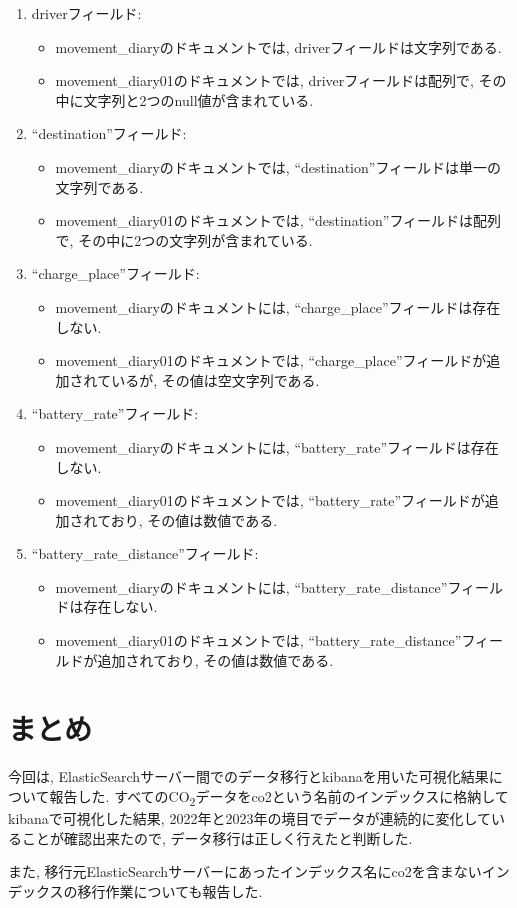 \documentclass[a4j,12pt,]{jarticle}
\begin{document}
\begin{enumerate}
\item driverフィールド: 
\begin{itemize}
\item movement\_diaryのドキュメントでは, driverフィールドは文字列である.
\item movement\_diary01のドキュメントでは, driverフィールドは配列で, その中に文字列と2つのnull値が含まれている.
\end{itemize}

\item ``destination''フィールド: 
\begin{itemize}
\item movement\_diaryのドキュメントでは, ``destination''フィールドは単一の文字列である.
\item movement\_diary01のドキュメントでは, ``destination''フィールドは配列で, その中に2つの文字列が含まれている.
\end{itemize}

\item ``charge\_place''フィールド: 
\begin{itemize}
\item movement\_diaryのドキュメントには, ``charge\_place''フィールドは存在しない.
\item movement\_diary01のドキュメントでは, ``charge\_place''フィールドが追加されているが, その値は空文字列である.
\end{itemize}

\item ``battery\_rate''フィールド: 
\begin{itemize}
\item movement\_diaryのドキュメントには, ``battery\_rate''フィールドは存在しない.
\item movement\_diary01のドキュメントでは, ``battery\_rate''フィールドが追加されており, その値は数値である.
\end{itemize}

\item ``battery\_rate\_distance''フィールド: 
\begin{itemize}
\item movement\_diaryのドキュメントには, ``battery\_rate\_distance''フィールドは存在しない.
\item movement\_diary01のドキュメントでは, ``battery\_rate\_distance''フィールドが追加されており, その値は数値である.
\end{itemize}

\end{enumerate}

\section{まとめ}
今回は, ElasticSearchサーバー間でのデータ移行とkibanaを用いた可視化結果について報告した.
すべてのCO\textsubscript{2}データをco2という名前のインデックスに格納してkibanaで可視化した結果, 2022年と2023年の境目でデータが連続的に変化していることが確認出来たので, データ移行は正しく行えたと判断した.

また, 移行元ElasticSearchサーバーにあったインデックス名にco2を含まないインデックスの移行作業についても報告した.
\end{document}
